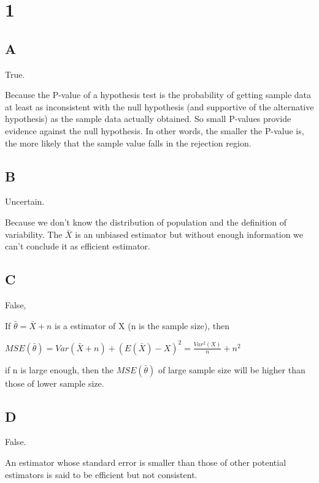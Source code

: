 \documentclass{article}
\begin{document}
	\section*{1}
	
	\subsection*{A}
	True. 
	
	Because the P-value of a hypothesis test is the probability of getting sample data at least as inconsistent with the null hypothesis (and supportive of the alternative hypothesis) as the sample data actually obtained. So small P-values provide evidence against the null hypothesis. In other words, the smaller the P-value is, the more likely that the sample value falls in the rejection region.
	
	\subsection*{B}
	Uncertain.
	
	Because we don't know the distribution of population and the definition of variability. The $\bar{X}$ is an unbiased estimator but without enough information we can't conclude it as efficient estimator.
	
	
	\subsection*{C}
	False,
	
	If $\bar{\theta}=\bar{X}+n$ is a estimator of X (n is the sample size), then 
	
	$MSE(\bar{\theta})=Var(\bar{X}+n)+(E(\bar{X})-X)^2=\frac{Var^2(X)}{n}+n^2$
	
	if n is large enough, then the $MSE(\bar{\theta})$ of large sample size will be higher than those of lower sample size.
	
	\subsection*{D}
	
	False. 
	
	An estimator whose standard error is smaller than those of other potential
estimators is said to be efficient but not consistent.
	
\end{document}
